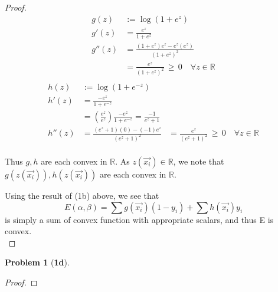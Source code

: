 \documentclass[10pt]{article}
\theoremstyle{plain}
\theoremstyle{definition}
\newtheorem*{prob*}{Problem}
\providecommand{\R}{\mathbb{R}}%
\numberwithin{equation}{section}
\begin{document}
\begin{proof}
  \[
  \begin{aligned}
    g(z)   &:= \log(1+e^{z}) \\
    g'(z)  &= \frac{e^{z}}{1+e^{z}} \\
    g''(z) &= \frac{ (1+e^{z}) e^{z} - e^{z} (e^{z}) }{(1+e^{z})^2} \\
           &= \frac{ e^{z} }{ (1+e^{z})^2 } \, \geq \, 0
                \quad \forall z \in \R \\
  \end{aligned}
  \]
  \[
  \begin{aligned}
    h(z)   &:= \log(1+e^{-z}) \\
    h'(z)   &= \frac{-e^{z}}{1+e^{-z}} \\
            &= \left(\frac{e^{z}}{e^{z}}\right) \frac{-e^{z}}{1+e^{-z}}
                  = \frac{-1}{e^{z} + 1 }\\
    h''(z)  &= \frac{(e^{z}+1)(0) - (-1)e^{z}}{(e^{z}+1)^2}
            &= \frac{e^{z}}{(e^{z}+1)^2} \, \geq \, 0
                \quad \forall z \in \R \\
  \end{aligned}
  \]

  Thus $g, h$ are each convex in $\R$.
  As $z(\vec{x_i}) \in \R$, we note that
  $g(z(\vec{x_i})), h(z(\vec{x_i}))$ are each convex in $\R$.

  Using the result of (1b) above, we see that
  \[
    E(\alpha, \beta) = \sum g(\vec{x_i}) (1 - y_i) + \sum h(\vec{x_i})y_i
  \]
  is simply a sum of convex function with appropriate scalars, and thus E is
  convex.\\

\end{proof}

\begin{prob*}[\bf{1d}]
\end{prob*}

\begin{proof}

\end{proof}
\end{document}
